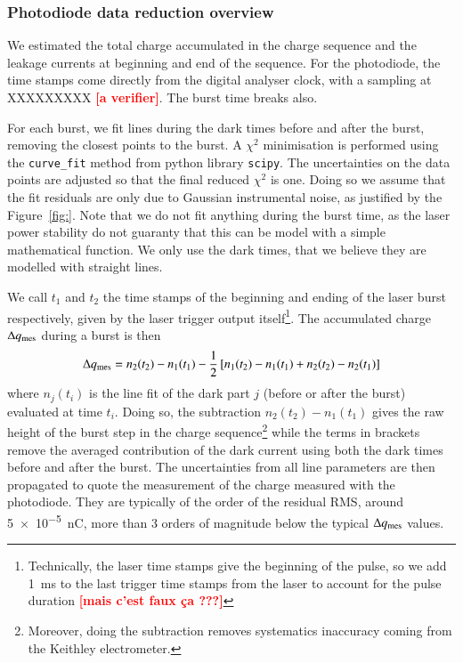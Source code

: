 \documentclass[printer]{aa}
\newcommand{\todo}[1]{\textbf{\textcolor{red}{[#1]}}\xspace}
\begin{document}
\subsubsection{Photodiode data reduction overview}

We estimated the total charge accumulated in the charge sequence and the leakage currents at beginning and end of the sequence. For the photodiode, the time stamps come directly from the digital analyser clock, with a sampling at XXXXXXXXX \todo{a verifier}. The burst time breaks also. %

For each burst, we fit lines during the dark times before and after the burst, removing the closest points to the burst. A $\chi^2$ minimisation is performed using the \texttt{curve\_fit} method from python library \texttt{scipy}. The uncertainties on the data points are adjusted so that the final reduced $\chi^2$ is one. Doing so we assume that the fit residuals are only due to Gaussian instrumental noise, as justified by the Figure~\ref{fig:}. Note that we do not fit anything during the burst time, as the laser power stability do not guaranty that this can be model with a simple mathematical function. We only use the dark times, that we believe they are modelled with straight lines.

We call $t_1$ and $t_2$ the time stamps of the beginning and ending of the laser burst respectively, given by the laser trigger output itself\footnote{Technically, the laser time stamps give the beginning of the pulse, so we add \SI{1}{\ms} to the last trigger time stamps from the laser to account for the pulse duration \todo{mais c'est faux ça ???}}. The accumulated charge $\Delta q_{\rm mes}$ during a burst is then
        $$\Delta q_{\rm mes} = n_2(t_2) - n_1(t_1) - \frac{1}{2} \left[n_1(t_2) - n_1(t_1) + n_2(t_2) - n_2(t_1)  \right]$$
where $n_j(t_i)$ is the line fit of the dark part $j$ (before or after the burst) evaluated at time $t_i$. Doing so, the subtraction $n_2(t_2) - n_1(t_1)$ gives the raw height of the burst step in the charge sequence\footnote{Moreover, doing the subtraction removes systematics inaccuracy coming from the Keithley electrometer.} while the terms in brackets remove the averaged contribution of the dark current using both the dark times before and after the burst. The uncertainties from all line parameters are then propagated to quote the measurement of the charge measured with the photodiode. They are typically of the order of the residual RMS, around \SI{5e-5}{\nano\coulomb}, more than 3 orders of magnitude below the typical $\Delta q_{\rm mes}$ values.
\end{document}
